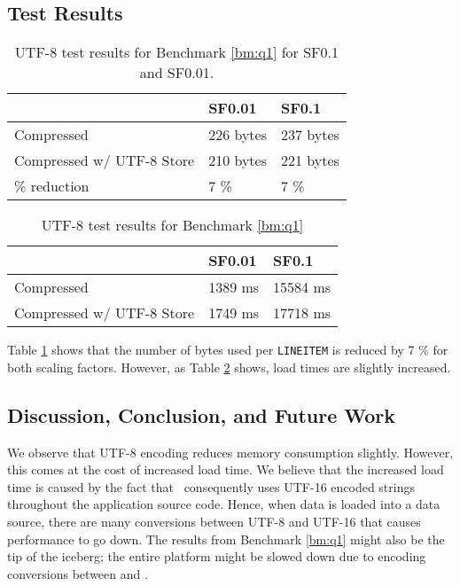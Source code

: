 \subsection{Test Results}
\label{sub:Test Results}
\begin{table}
    \begin{tabularx}{0.75\textwidth}{X | X X}
        & SF0.01 & SF0.1 \\ 
        \hline
        \hline
        Compressed & 226 bytes & 237 bytes \\
        Compressed w/ UTF-8 Store & 210 bytes & 221 bytes \\
        \% reduction & 7 \% & 7 \% \\
    \end{tabularx}
    \caption{UTF-8 test results for Benchmark \ref{bm:q1} for SF0.1 and SF0.01.}
    \label{tab:utf-8-bpl}
\end{table}
\begin{table}
    \begin{tabularx}{0.75\textwidth}{X | X X}
        & SF0.01 & SF0.1 \\ 
        \hline
        \hline
        Compressed & 1389 ms & 15584 ms \\
        Compressed w/ UTF-8 Store & 1749 ms & 17718 ms \\
    \end{tabularx}
    \caption{UTF-8 test results for Benchmark \ref{bm:q1}}
    \label{tab:utf-8-load}
\end{table}
Table \ref{tab:utf-8-bpl} shows that the number of bytes used per \texttt{LINEITEM} is reduced by 7 \% for both scaling factors. However, as Table \ref{tab:utf-8-load} shows, load times are slightly increased.

\subsection{Discussion, Conclusion, and Future Work}
\label{sub:Discussion, Conclusion, and Future Work}
We observe that UTF-8 encoding reduces memory consumption slightly. However, this comes at the cost of increased load time. We believe that the increased load time is caused by the fact that \gap~consequently uses UTF-16 encoded strings throughout the application source code. Hence, when data is loaded into a data source, there are many conversions between UTF-8 and UTF-16 that causes performance to go down. The results from Benchmark \ref{bm:q1} might also be the tip of the iceberg; the entire platform might be slowed down due to encoding conversions between  and .

